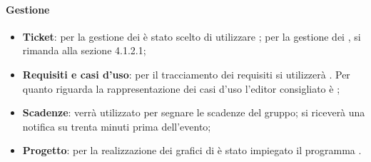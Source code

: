 	\paragraph{Gestione}
	\begin{itemize}
		\item \textbf{Ticket}: per la gestione dei  è stato scelto di utilizzare ; per la gestione dei , si rimanda alla sezione 4.1.2.1;
		\item \textbf{Requisiti e casi d'uso}: per il tracciamento dei requisiti si utilizzerà . Per quanto riguarda la rappresentazione dei casi d'uso l'editor consigliato è ; %
		\item \textbf{Scadenze}:  verrà utilizzato per segnare le scadenze del gruppo; si riceverà una notifica su  trenta minuti prima dell'evento;
		\item \textbf{Progetto}: per la realizzazione dei grafici di  è stato impiegato il programma .
	\end{itemize}